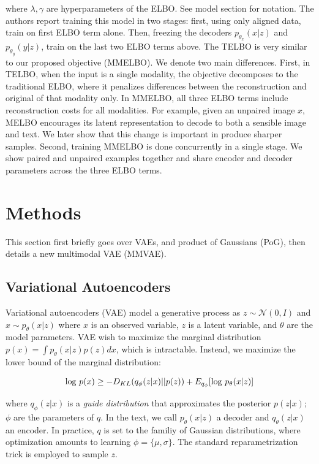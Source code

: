 \documentclass{article}
\begin{document}
where $\lambda, \gamma$ are hyperparameters of the ELBO. See model section for notation. The authors report training this model in two stages: first, using only aligned data, train on first ELBO term alone. Then, freezing the decoders $p_{\theta_{x}}(x|z)$ and $p_{\theta_{y}}(y|z)$, train on the last two ELBO terms above. The TELBO is very similar to our proposed objective (MMELBO). We denote two main differences. First, in TELBO, when the input is a single modality, the objective decomposes to the traditional ELBO, where it penalizes differences between the reconstruction and original of that modality only. In MMELBO, all three ELBO terms include reconstruction costs for all modalities. For example, given an unpaired image $x$, MELBO encourages its latent representation to decode to both a sensible image and text. We later show that this change is important in produce sharper samples. Second, training MMELBO is done concurrently in a single stage. We show paired and unpaired examples together and share encoder and decoder parameters across the three ELBO terms. 

\section{Methods}
This section first briefly goes over VAEs, and product of Gaussians (PoG), then details a new multimodal VAE (MMVAE).

\subsection{Variational Autoencoders}
Variational autoencoders (VAE) model a generative process as $z \sim \mathcal{N}(0, I)$ and $x \sim p_{\theta}(x | z)$ where $x$ is an observed variable, $z$ is a latent variable, and $\theta$ are the model parameters. VAE wish to maximize the marginal distribution $p(x) = \int p_{\theta}(x | z)p(z)dx$, which is intractable. Instead, we maximize the lower bound of the marginal distribution:

\begin{equation}
    \textup{log } p(x) \geq -D_{KL}(q_{\phi}(z | x) || p(z)) + E_{q_{\phi}}[\textup{log } p_{\theta}(x | z)]
\end{equation}

where $q_{\phi}(z | x)$ is a \textit{guide distribution} that approximates the posterior $p(z | x)$; $\phi$ are the parameters of $q$. In the text, we call $p_{\theta}(x | z)$ a decoder and $q_{\theta}(z | x)$ an encoder. In practice, $q$ is set to the familiy of Gaussian distributions, where optimization amounts to learning $\phi=\{\mu, \sigma\}$. The standard reparametrization trick is employed to sample $z$.
\end{document}
